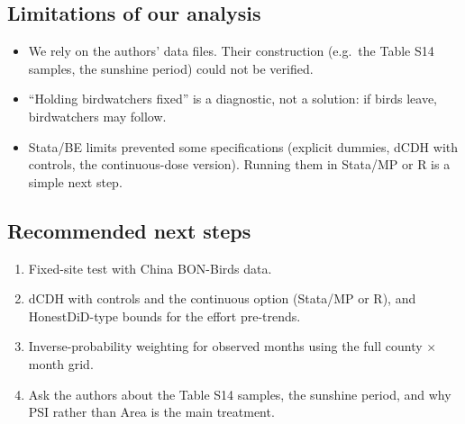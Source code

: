 \documentclass[11pt]{article}
\begin{document}
\subsection{Limitations of our analysis}
\begin{itemize}[leftmargin=14pt,itemsep=1pt]
\item We rely on the authors' data files. Their construction (e.g.\ the Table S14 samples, the sunshine period) could not be verified.
\item ``Holding birdwatchers fixed'' is a diagnostic, not a solution: if birds leave, birdwatchers may follow.
\item Stata/BE limits prevented some specifications (explicit dummies, dCDH with controls, the continuous-dose version). Running them in Stata/MP or R is a simple next step.
\end{itemize}

\subsection{Recommended next steps}
\begin{enumerate}[leftmargin=18pt,itemsep=1pt]
\item Fixed-site test with China BON-Birds data.
\item dCDH with controls and the continuous option (Stata/MP or R), and HonestDiD-type bounds for the effort pre-trends.
\item Inverse-probability weighting for observed months using the full county $\times$ month grid.
\item Ask the authors about the Table S14 samples, the sunshine period, and why PSI rather than Area is the main treatment.
\end{enumerate}

\appendix
\end{document}
